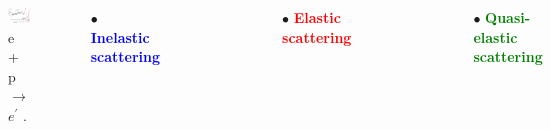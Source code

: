 \documentclass[12pt]{beamer}
\begin{document}
\iffalse
\begin{frame}
\begin{columns}[c] %
	\begin{figure}[]
		\centering
		\includegraphics[width=5cm]{../images/Thesis/elasticspectrum_1.png}
		\caption*{e + p $\rightarrow$ $e^{\prime}$ \cite{deltaIsobar}.}

	\end{figure}

	$\bullet$ \textbf{\textcolor{blue}{Inelastic scattering}}\\

	\begin{figure}[]
		\includegraphics[width=4cm]{../images/ele_draw.png}
	\end{figure}
	
	
	$\bullet$ \textbf{\textcolor{red}{Elastic scattering}}\\
	
	\begin{figure}[]
		\includegraphics[width=4cm]{../images/ele_draw.png}
	\end{figure}
	$\bullet$ \textbf{\textcolor{green}{Quasi-elastic scattering}}\\
	
	\begin{figure}[]
		\includegraphics[width=4cm]{../images/ele_draw.png}
	\end{figure}	
	
	
\end{columns}
\end{frame}
\end{document}
